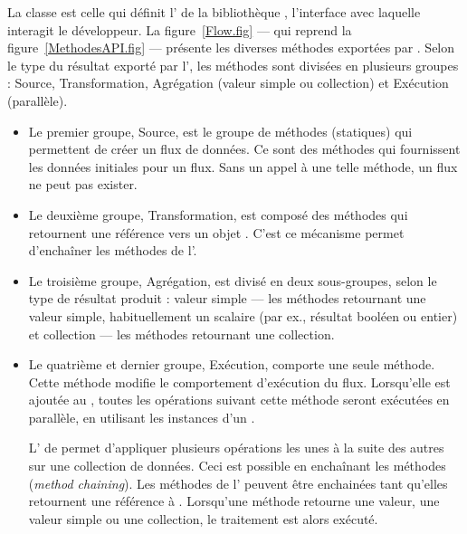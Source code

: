 La classe  est celle qui définit l' de la biblioth\`eque , l'interface avec laquelle interagit le d\'eveloppeur. La figure~\ref{Flow.fig} --- qui reprend la figure~\ref{MethodesAPI.fig} --- pr\'esente les diverses m\'ethodes export\'ees par . Selon le type du résultat export\'e par l', les m\'ethodes sont divis\'ees en plusieurs groupes : Source, Transformation, Agr\'egation (valeur simple ou collection) et Ex\'ecution (parallèle).

\begin{itemize}

\item Le premier groupe, Source, est le groupe de méthodes (statiques) qui permettent de créer un flux de donn\'ees. Ce sont des m\'ethodes qui fournissent les donn\'ees initiales pour un flux. Sans un appel \`a une telle m\'ethode, un flux ne peut pas exister. 

\item Le deuxi\`eme groupe, Transformation, est composé des m\'ethodes qui retournent une r\'ef\'erence vers un objet . C'est ce m\'ecanisme permet d'encha\^iner les m\'ethodes de l'.

\item Le troisi\`eme groupe, Agr\'egation, est divis\'e en deux sous-groupes, selon le type de r\'esultat produit : valeur simple --- les m\'ethodes retournant une valeur simple, habituellement un scalaire (par ex., r\'esultat bool\'een ou entier) et collection --- les m\'ethodes retournant une collection.

\item Le quatrième et dernier groupe, Exécution, comporte une seule m\'ethode. Cette m\'ethode modifie le comportement d'ex\'ecution du flux. Lorsqu'elle est ajout\'ee au  , toutes les op\'erations suivant cette m\'ethode seront ex\'ecut\'ees en parall\`ele, en utilisant les instances d'un  .

L' de  permet d'appliquer plusieurs op\'erations les unes à la suite des autres sur une collection de donn\'ees. Ceci est possible en encha\^inant les m\'ethodes (\emph{method chaining}). Les m\'ethodes de l' peuvent \^etre enchain\'ees tant qu'elles retournent une r\'ef\'erence \`a . Lorsqu'une m\'ethode retourne une valeur, une valeur simple ou une collection, le traitement est alors ex\'ecut\'e. 

\end{itemize}


